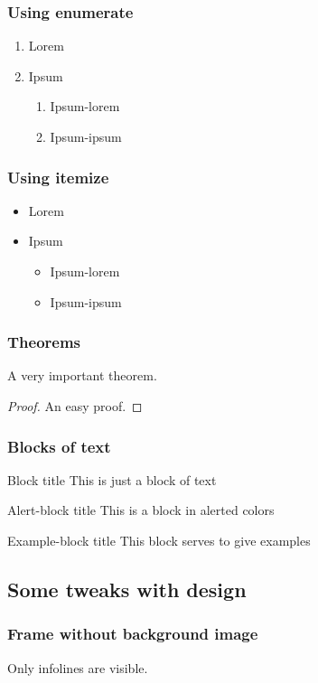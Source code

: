 \documentclass{beamer}
\begin{document}
\begin{frame}
\frametitle{Using enumerate}
\begin{enumerate}
\item Lorem 
\item Ipsum
\begin{enumerate}
\item Ipsum-lorem
\item Ipsum-ipsum
\end{enumerate}
\end{enumerate}

\end{frame}

\begin{frame}
\frametitle{Using itemize}
\begin{itemize}
\item Lorem 
\item Ipsum
\begin{itemize}
\item Ipsum-lorem
\item Ipsum-ipsum
\end{itemize}
\end{itemize}
\end{frame}

\begin{frame}
\frametitle{Theorems}
\begin{theorem}
A very important theorem.
\end{theorem}
\begin{proof}
An easy proof.
\end{proof}
\end{frame}


\begin{frame}
\frametitle{Blocks of text}
\begin{block}{Block title}
This is just a block of text
\end{block}

\begin{alertblock}{Alert-block title}
This is a block in alerted colors
\end{alertblock}

\begin{exampleblock}{Example-block title}
This block serves to give examples
\end{exampleblock}
\end{frame}

\subsection{Some tweaks with design}
{ %
\begin{frame}
\frametitle{Frame without background image}


Only infolines are visible.
\end{frame}
}
\end{document}
